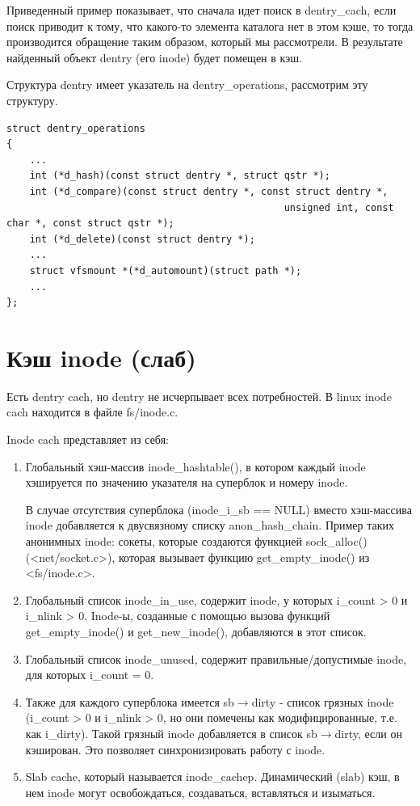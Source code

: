\documentclass[12pt,a4paper]{scrreprt}
\begin{document}
Приведенный пример показывает, что сначала идет поиск в dentry\_cach, если поиск приводит к тому, что какого-то элемента каталога нет в этом кэше, то тогда производится обращение таким образом, который мы рассмотрели. В результате найденный объект dentry (его inode) будет помещен в кэш.

Структура dentry имеет указатель на dentry\_operations, рассмотрим эту структуру.

\begin{lstlisting}
struct dentry_operations
{
	...
	int (*d_hash)(const struct dentry *, struct qstr *);
	int (*d_compare)(const struct dentry *, const struct dentry *, 
												unsigned int, const char *, const struct qstr *);
	int (*d_delete)(const struct dentry *);
	...
	struct vfsmount *(*d_automount)(struct path *);
	...
};
\end{lstlisting}

\section{Кэш inode (слаб)}

Есть dentry cach, но dentry не исчерпывает всех потребностей. В linux inode cach находится в файле fs/inode.c. 

Inode cach представляет из себя:

\begin{enumerate}
	\item Глобальный хэш-массив inode\_hashtable(), в котором каждый inode хэшируется по значению указателя на суперблок и номеру inode. 
	
	В случае отсутствия суперблока (inode\_i\_sb == NULL) вместо хэш-массива inode добавляется к двусвязному списку anon\_hash\_chain. Пример таких анонимных inode: сокеты, которые создаются функцией sock\_alloc() (<net/socket.c>), которая вызывает функцию get\_empty\_inode() из <fs/inode.c>.
	\item Глобальный список inode\_in\_use, содержит inode, у которых i\_count > 0 и i\_nlink > 0. Inode-ы, созданные с помощью вызова функций get\_empty\_inode() и get\_new\_inode(), добавляются в этот список.
	\item Глобальный список inode\_unused, содержит правильные/допустимые inode, для которых i\_count = 0.
	\item Также для каждого суперблока имеется sb$\rightarrow$dirty - список грязных inode (i\_count > 0 и i\_nlink > 0, но они помечены как модифицированные, т.е. как i\_dirty). Такой грязный inode добавляется в список sb$\rightarrow$dirty, если он кэширован. Это позволяет синхронизировать работу с inode.
	\item Slab cache, который называется inode\_cachep. Динамический (slab) кэш, в нем inode могут освобождаться, создаваться, вставляться и изыматься. 
\end{enumerate}
\end{document}
